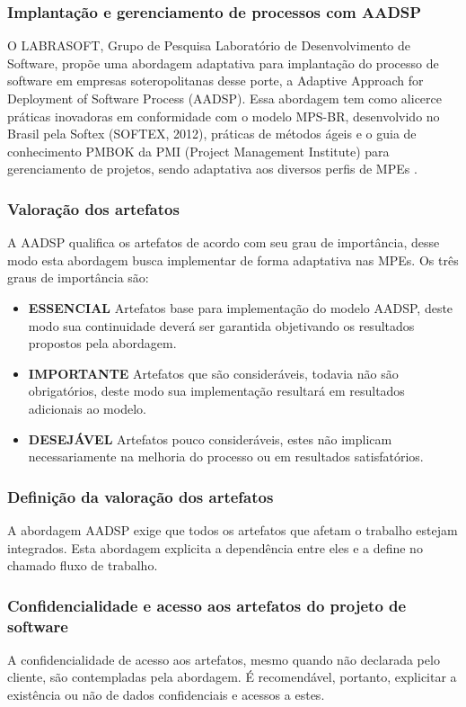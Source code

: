 \documentclass{acm_proc_article-sp}
\begin{document}
\subsubsection{Implantação e gerenciamento de processos com AADSP}
O LABRASOFT, Grupo de Pesquisa Laboratório de Desenvolvimento de Software, propõe uma abordagem adaptativa para implantação do processo de software em empresas soteropolitanas desse porte, a Adaptive Approach for Deployment of Software Process (AADSP). Essa abordagem tem como alicerce práticas inovadoras em conformidade com o modelo MPS-BR, desenvolvido no Brasil pela Softex (SOFTEX, 2012), práticas de métodos ágeis e o guia de conhecimento PMBOK da PMI (Project Management Institute) para gerenciamento de projetos, sendo adaptativa aos diversos perfis de MPEs \cite{aadsp:hibirdo}. 

\subsubsection*{Valoração dos artefatos}
A AADSP qualifica os artefatos de acordo com seu grau de importância, desse modo esta abordagem busca implementar de forma adaptativa nas MPEs. Os três graus de importância são:

\begin{itemize}
\item \textbf{ESSENCIAL} Artefatos base para implementação do modelo AADSP, deste modo sua continuidade deverá ser garantida objetivando os resultados propostos pela abordagem\cite{aadsp:hibirdo}.
\item \textbf{IMPORTANTE} Artefatos que são consideráveis, todavia não são obrigatórios, deste modo sua implementação resultará em resultados adicionais ao modelo\cite{aadsp:hibirdo}.
\item \textbf{DESEJÁVEL} Artefatos pouco consideráveis, estes não implicam necessariamente na melhoria do processo ou em resultados satisfatórios\cite{aadsp:hibirdo}.
\end{itemize}

\subsubsection*{Definição da valoração dos artefatos}
A abordagem AADSP  exige que todos os artefatos que afetam o trabalho estejam integrados. Esta abordagem explicita a dependência entre eles e a define no chamado fluxo de trabalho\cite{aadsp:hibirdo}.

\subsubsection*{Confidencialidade e acesso aos artefatos do projeto de software}
A confidencialidade de acesso aos artefatos, mesmo quando não declarada pelo cliente, são contempladas pela abordagem. É recomendável, portanto, explicitar a existência ou não de dados confidenciais e acessos a estes\cite{aadsp:hibirdo}.
\end{document}
